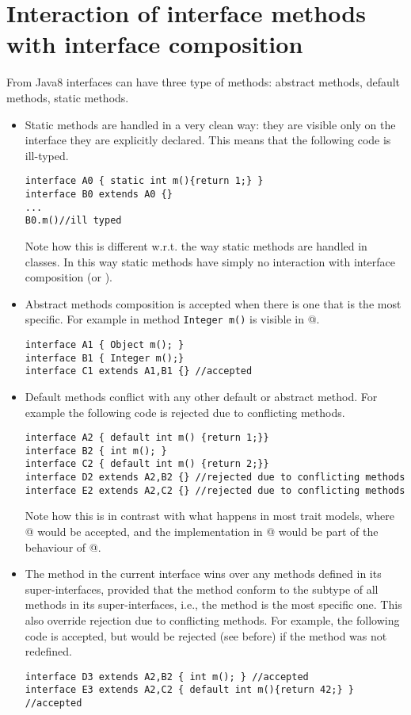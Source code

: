 \section{Interaction of interface methods with interface composition}
From Java8 interfaces can have three type of methods:
abstract methods, default methods, static methods.
\begin{itemize}
\item Static methods are handled in a very clean way: they are visible only on the interface they are explicitly declared. This means that 
the following code is ill-typed.
\begin{lstlisting}
interface A0 { static int m(){return 1;} }
interface B0 extends A0 {}
...
B0.m()//ill typed
\end{lstlisting}
Note how this is different w.r.t. the way static methods are handled in classes.
In this way static methods have simply no interaction with interface composition (\Q@extends@ or \Q@implements@).

\item Abstract methods composition is accepted when there is one that is the most specific.  For example in 
method \texttt{Integer m()} is visible in @.

\begin{lstlisting}
interface A1 { Object m(); }
interface B1 { Integer m();}
interface C1 extends A1,B1 {} //accepted
\end{lstlisting}

\item Default methods conflict with any other default or abstract method. For
example the following code is rejected due to conflicting methods.
\begin{lstlisting}
interface A2 { default int m() {return 1;}}
interface B2 { int m(); }
interface C2 { default int m() {return 2;}}
interface D2 extends A2,B2 {} //rejected due to conflicting methods
interface E2 extends A2,C2 {} //rejected due to conflicting methods
\end{lstlisting}
Note how this is in contrast with what happens in most trait models, where @ would be accepted, and the implementation in @ would be part of the behaviour of @.

\item The method in the current interface wins over any methods defined in its
super-interfaces, provided that the method conform to the subtype of all methods
in its super-interfaces, i.e., the method is the most specific one.
This also override rejection due to conflicting methods. For example, the following code is accepted, but would be rejected (see before) if the method \Q@m@ was not redefined.
\begin{lstlisting}
interface D3 extends A2,B2 { int m(); } //accepted
interface E3 extends A2,C2 { default int m(){return 42;} } //accepted
\end{lstlisting}
\end{itemize}

